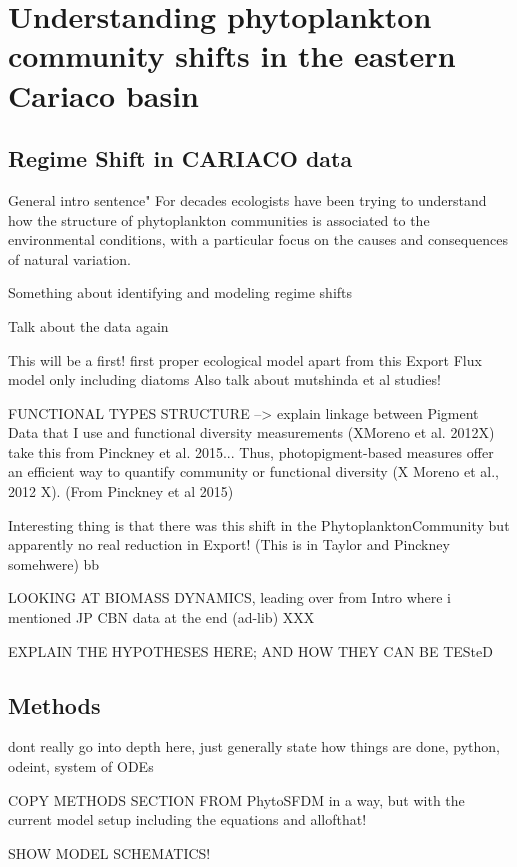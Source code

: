 \chapter{Understanding phytoplankton community shifts in the eastern Cariaco basin}

\small {\textbf{}}


\normalsize
\section{Regime Shift in CARIACO data}
General intro sentence" For decades ecologists have been trying to understand how the structure of phytoplankton communities is associated to the environmental conditions, with a particular focus on the causes and consequences of natural variation.

Something about identifying and modeling regime shifts

Talk about the data again

This will be a first! first proper ecological model apart from this Export Flux model only including diatoms \citep{Walsh2002a}
Also talk about mutshinda et al studies!


FUNCTIONAL TYPES STRUCTURE --> explain linkage between Pigment Data that I use and functional diversity measurements (XMoreno et al. 2012X) take this from Pinckney et al. 2015...
Thus, photopigment-based measures offer an efficient way to quantify community or functional diversity (X Moreno et al., 2012 X). (From Pinckney et al 2015)

Interesting thing is that there was this shift in the PhytoplanktonCommunity but apparently no real reduction in Export! (This is in Taylor and Pinckney somehwere)
bb


LOOKING AT BIOMASS DYNAMICS, leading over from Intro where i mentioned JP CBN data at the end (ad-lib)
XXX

EXPLAIN THE HYPOTHESES HERE; AND HOW THEY CAN BE TESteD

\section{Methods}


dont really go into depth here, just generally state how things are done, python, odeint, system of ODEs

COPY METHODS SECTION FROM PhytoSFDM in a way, but with the current model setup
including the equations and allofthat!

SHOW MODEL SCHEMATICS!

